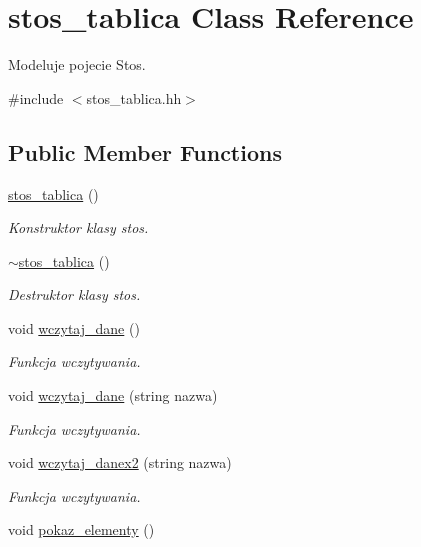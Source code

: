\hypertarget{classstos__tablica}{\section{stos\-\_\-tablica Class Reference}
\label{classstos__tablica}
}


Modeluje pojecie Stos.  




{\ttfamily \#include $<$stos\-\_\-tablica.\-hh$>$}

\subsection*{Public Member Functions}
\begin{DoxyCompactItemize}
\item 
\hyperlink{classstos__tablica_a7dfdcb1a98f9434a5f94ebc19ac14af5}{stos\-\_\-tablica} ()
\begin{DoxyCompactList}\small\item\em Konstruktor klasy stos. \end{DoxyCompactList}\item 
\hyperlink{classstos__tablica_a684a8f468cb76ecf6c01df66fcbae8f6}{$\sim$stos\-\_\-tablica} ()
\begin{DoxyCompactList}\small\item\em Destruktor klasy stos. \end{DoxyCompactList}\item 
void \hyperlink{classstos__tablica_a68d7d3ed8622663ff7aca3b9696724c5}{wczytaj\-\_\-dane} ()
\begin{DoxyCompactList}\small\item\em Funkcja wczytywania. \end{DoxyCompactList}\item 
void \hyperlink{classstos__tablica_a33b9257de4213c84e96e666898f5ead0}{wczytaj\-\_\-dane} (string nazwa)
\begin{DoxyCompactList}\small\item\em Funkcja wczytywania. \end{DoxyCompactList}\item 
void \hyperlink{classstos__tablica_ac940862b9c8d4807a471ffd1db23ea5b}{wczytaj\-\_\-danex2} (string nazwa)
\begin{DoxyCompactList}\small\item\em Funkcja wczytywania. \end{DoxyCompactList}\item 
void \hyperlink{classstos__tablica_a89f6cd04da8bafdded7b8d0f003e3978}{pokaz\-\_\-elementy} ()

\end{DoxyCompactItemize}
